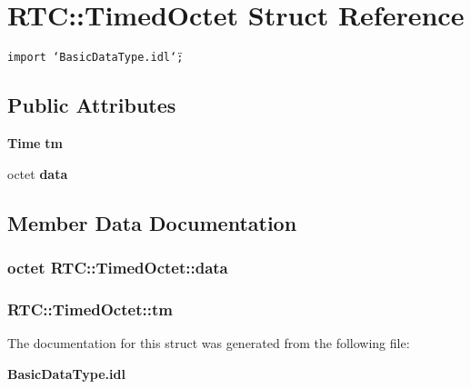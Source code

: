 \section{RTC::Timed\-Octet Struct Reference}
\label{structRTC_1_1TimedOctet}
{\tt import \char`\"{}Basic\-Data\-Type.idl\char`\"{};}

\subsection*{Public Attributes}
\begin{CompactItemize}
\item 
{\bf Time} {\bf tm}
\item 
octet {\bf data}
\end{CompactItemize}


\subsection{Member Data Documentation}
\subsubsection{\setlength{\rightskip}{0pt plus 5cm}octet {\bf RTC::Timed\-Octet::data}}\label{structRTC_1_1TimedOctet_RTC_1_1TimedOcteto1}


\subsubsection{ {\bf RTC::Timed\-Octet::tm}}\label{structRTC_1_1TimedOctet_RTC_1_1TimedOcteto0}




The documentation for this struct was generated from the following file:\begin{CompactItemize}
\item 
{\bf Basic\-Data\-Type.idl}\end{CompactItemize}
